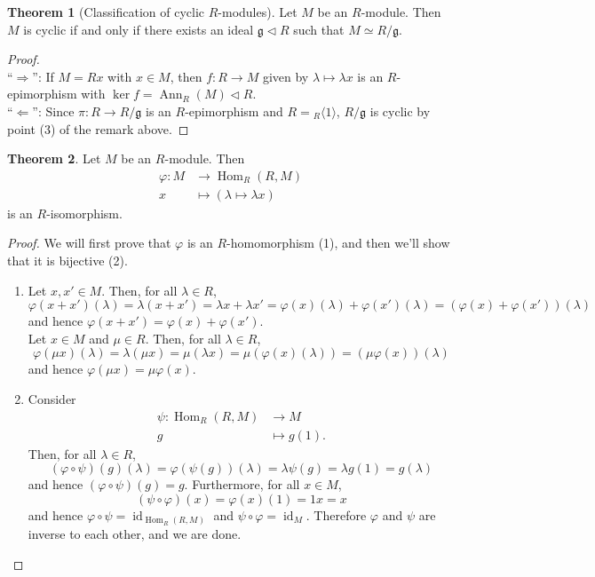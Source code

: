 \documentclass[12pt,a4paper]{report}
\theoremstyle{definition}
\newtheorem{theorem}{Theorem}[chapter] %
\theoremstyle{num.custom-title}
\DeclareMathOperator{\id}{id}
\DeclareMathOperator{\Hom}{Hom}
\DeclareMathOperator{\Ann}{Ann}
\DeclareMathOperator{\imp}{\Rightarrow}
\DeclareMathOperator{\pmi}{\Leftarrow}
\newcommand{\g}{\mathfrak{g}}
\renewcommand{\phi}{\varphi}
\begin{document}
\begin{theorem}[Classification of cyclic $R$-modules]\label{class_cyc_mod}
Let $M$ be an $R$-module. Then $M$ is cyclic if and only if there exists an ideal $\g \lhd R$ such that $M \simeq R/\g$.
\begin{proof}\ \\
``$\imp$'': If $M=Rx$ with $x \in M$, then $f: R \to M$ given by $\lambda \mapsto \lambda x$ is an $R$-epimorphism with $\ker f = \Ann_R(M) \lhd R$.\\
``$\pmi$'': Since $\pi : R \to R/\g$ is an $R$-epimorphism and $R={}_R\langle 1 \rangle$, $R/\g$ is cyclic by point (3) of the remark above.
\end{proof}
\end{theorem}

\begin{theorem}
Let $M$ be an $R$-module. Then
\begin{align*}
\phi \colon M &\to \Hom_R(R,M) \\
x &\mapsto (\lambda \mapsto \lambda x)
\end{align*}
is an $R$-isomorphism.
\begin{proof}
We will first prove that $\phi$ is an $R$-homomorphism (1), and then we'll show that it is bijective (2).
\begin{enumerate}
\item Let $x,x' \in M$. Then, for all $\lambda \in R$,
\[
\phi(x+x')(\lambda) = \lambda(x+x') = \lambda x + \lambda x' = \phi(x)(\lambda)+\phi(x')(\lambda) = (\phi(x)+\phi(x'))(\lambda)
\]
and hence $\phi(x+x')=\phi(x)+\phi(x')$.\\
Let $x \in M$ and $\mu \in R$. Then, for all $\lambda \in R$,
\[
\phi(\mu x)(\lambda) = \lambda(\mu x) = \mu(\lambda x) = \mu(\phi(x)(\lambda)) = (\mu\phi(x))(\lambda)
\]
and hence $\phi(\mu x) = \mu \phi(x)$.
\item Consider 
\begin{align*}
\psi \colon \Hom_R(R,M) &\to M \\
g &\mapsto g(1).
\end{align*}
Then, for all $\lambda \in R$,
\[
(\phi \circ \psi)(g)(\lambda) = \phi(\psi(g))(\lambda) = \lambda \psi(g) = \lambda g(1) = g(\lambda)
\]
and hence $(\phi \circ \psi)(g)=g$. Furthermore, for all $x \in M$,
\[
(\psi \circ \phi)(x) = \phi(x)(1) = 1x = x
\]
and hence $\phi \circ \psi = \id_{\Hom_R(R,M)}$ and $\psi \circ \phi=\id_M$. Therefore $\phi$ and $\psi$ are inverse to each other, and we are done.
\end{enumerate}
\end{proof}
\end{theorem}
\end{document}
